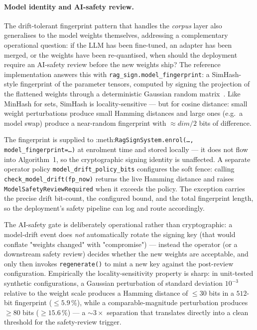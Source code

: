 \paragraph{Model identity and AI-safety review.}  The
drift\nobreakdash-tolerant fingerprint pattern that handles the
\emph{corpus} layer also generalises to the model weights
themselves, addressing a complementary operational question: if the
LLM has been fine\nobreakdash-tuned, an adapter has been merged, or
the weights have been re\nobreakdash-quantised, when should the
deployment require an AI\nobreakdash-safety review before the new
weights ship?  The reference implementation answers this with
\texttt{rag\_sign.model\_fingerprint}: a SimHash-style fingerprint
of the parameter tensors, computed by signing the projection of
the flattened weights through a deterministic Gaussian random
matrix~\cite{charikar2002simhash}.  Like MinHash for sets, SimHash
is locality\nobreakdash-sensitive — but for cosine distance: small
weight perturbations produce small Hamming distances and large
ones (e.g.\ a model swap) produce a near\nobreakdash-random
fingerprint with $\approx \mathit{dim}/2$ bits of difference.

The fingerprint is supplied to
:meth:\texttt{RagSignSystem.enrol(\dots, model\_fingerprint=\dots)}
at enrolment time and stored locally — it does not flow into
Algorithm~1, so the cryptographic signing identity is unaffected.
A separate operator policy
\texttt{model\_drift\_policy\_bits} configures the soft fence:
calling \texttt{check\_model\_drift(fp\_now)} returns the live
Hamming distance and raises
\texttt{ModelSafetyReviewRequired} when it exceeds the policy.  The
exception carries the precise drift bit\nobreakdash-count, the
configured bound, and the total fingerprint length, so the
deployment's safety pipeline can log and route accordingly.

The AI-safety gate is deliberately operational rather than
cryptographic: a model-drift event does \emph{not} automatically
rotate the signing key (that would conflate "weights changed" with
"compromise") — instead the operator (or a downstream safety
review) decides whether the new weights are acceptable, and only
then invokes \texttt{regenerate()} to mint a new key against the
post\nobreakdash-review configuration.  Empirically the
locality\nobreakdash-sensitivity property is sharp: in unit\nobreakdash-tested
synthetic configurations, a Gaussian perturbation of standard
deviation $10^{-3}$ relative to the weight scale produces a Hamming
distance of $\leq 30$ bits in a $512$\nobreakdash-bit fingerprint
($\leq 5.9\,\%$), while a comparable\nobreakdash-magnitude
perturbation produces $\geq 80$ bits ($\geq 15.6\,\%$) — a
$\sim\!3\times$ separation that translates directly into a clean
threshold for the safety\nobreakdash-review trigger.

